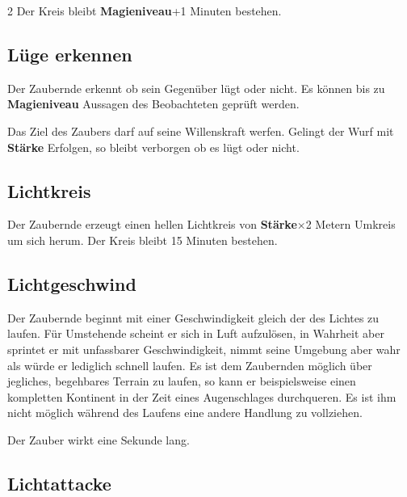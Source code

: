 \begin{multicols*}{2}
Der Kreis bleibt \textbf{Magieniveau}+1 Minuten bestehen.



\subsection{Lüge erkennen}

Der Zaubernde erkennt ob sein Gegenüber lügt oder nicht. Es können bis zu \textbf{Magieniveau} Aussagen des Beobachteten geprüft werden.

Das Ziel des Zaubers darf auf seine Willenskraft werfen. Gelingt der Wurf mit \textbf{Stärke} Erfolgen, so bleibt verborgen ob es lügt oder nicht.



\subsection{Lichtkreis}

Der Zaubernde erzeugt einen hellen Lichtkreis von \textbf{Stärke}×2 Metern Umkreis um sich herum. Der Kreis bleibt 15 Minuten bestehen.



\subsection{Lichtgeschwind}

Der Zaubernde beginnt mit einer Geschwindigkeit gleich der des Lichtes zu laufen. Für Umstehende scheint er sich in Luft aufzulösen, in Wahrheit aber sprintet er mit unfassbarer Geschwindigkeit, nimmt seine Umgebung aber wahr als würde er lediglich schnell laufen. Es ist dem Zaubernden möglich über jegliches, begehbares Terrain zu laufen, so kann er beispielsweise einen kompletten Kontinent in der Zeit eines Augenschlages durchqueren. Es ist ihm nicht möglich während des Laufens eine andere Handlung zu vollziehen.

Der Zauber wirkt eine Sekunde lang.



\subsection{Lichtattacke}


\end{multicols*}
